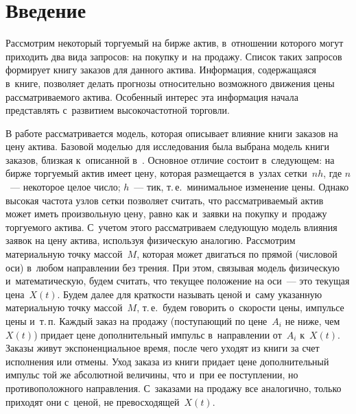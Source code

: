   
\vspace*{-3pt}



\thispagestyle{headings}

\begin{multicols}{2}

\label{st\stat}

\section{Введение}

Рассмотрим некоторый торгуемый на бирже актив, в~отношении которого 
могут приходить два вида запросов: на покупку и~на продажу. 
Список таких запросов формирует книгу заказов для данного актива. 
Информация, содержащаяся в~книге, позволяет делать прогнозы относительно 
возможного движения цены рассматриваемого актива. 
Особенный интерес эта информация начала представлять с~развитием высокочастотной
 торговли.

В работе рассматривается модель, которая описывает влияние книги 
заказов на цену актива. Базовой моделью для исследования была выбрана модель 
книги заказов, близкая к~описанной в~\cite{first}. Основное отличие состоит
 в~следующем: на бирже торгуемый актив имеет цену, которая размещается в~узлах 
 сетки~$nh$, где $n$~--- некоторое целое число; $h$~--- тик, т.\,е.\ 
 минимальное изменение цены. Однако высокая частота узлов сетки позволяет считать, 
 что рассматриваемый актив может иметь произвольную цену, равно как и~заявки на 
 покупку и~продажу торгуемого актива. С~учетом этого рассматриваем следующую модель 
 влияния заявок на цену актива, используя физическую аналогию.  
 Рассмотрим 
 материальную точку массой~$M$, которая может двигаться по прямой (числовой оси) 
 в~любом на\-прав\-ле\-нии без трения. При этом, связывая модель 
 физическую и~математическую, будем считать, что текущее положение на оси~--- 
 это текущая цена~$X(t)$.  Будем далее для краткости называть ценой и~саму 
 указанную материальную точку массой~$M$, т.\,е.\ 
 будем говорить о~ско\-рости цены, импульсе цены и~т.\,п. 
 Каждый заказ на продажу (поступающий по цене~$A_{i}$
не ниже, чем~$X(t)$) придает цене дополнительный импульс в~направлении от~$A_{i}$ 
к~$X(t)$. Заказы живут экспоненциальное время, после чего уходят из книги 
за счет исполнения или отмены. Уход заказа из книги  придает цене 
дополнительный импульс той же абсолютной величины, что и~при ее 
поступлении, но противоположного направления. С~заказами на продажу все аналогично, 
только приходят они с~ценой, не превосходящей~$X(t)$.


\end{multicols}
